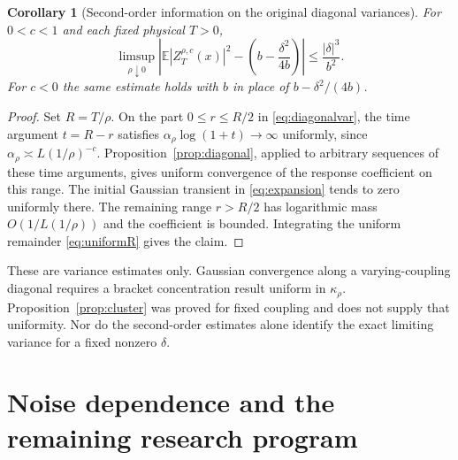 \documentclass[11pt]{article}
\numberwithin{equation}{section}
\newtheorem{corollary}[theorem]{Corollary}
\theoremstyle{definition}
\theoremstyle{remark}
\newcommand{\E}{\mathbb E}
\begin{document}
\begin{corollary}[Second-order information on the original diagonal variances]\label{cor:diagonal}
For $0<c<1$ and each fixed physical $T>0$,
\[
 \limsup_{\rho\downarrow0}\left|\E|Z_T^{\rho,c}(x)|^2-\left(b-\frac{\delta^2}{4b}\right)\right|\le\frac{|\delta|^3}{b^2}.
\]
For $c<0$ the same estimate holds with $b$ in place of $b-\delta^2/(4b)$.
\end{corollary}
\begin{proof}
Set $R=T/\rho$. On the part $0\le r\le R/2$ in \eqref{eq:diagonalvar}, the time argument $t=R-r$ satisfies $\alpha_\rho\log(1+t)\to\infty$ uniformly, since $\alpha_\rho\asymp L(1/\rho)^{-c}$. Proposition~\ref{prop:diagonal}, applied to arbitrary sequences of these time arguments, gives uniform convergence of the response coefficient on this range. The initial Gaussian transient in \eqref{eq:expansion} tends to zero uniformly there. The remaining range $r>R/2$ has logarithmic mass $O(1/L(1/\rho))$ and the coefficient is bounded. Integrating the uniform remainder \eqref{eq:uniformR} gives the claim.
\end{proof}
These are variance estimates only. Gaussian convergence along a varying-coupling diagonal requires a bracket concentration result uniform in $\kappa_\rho$. Proposition~\ref{prop:cluster} was proved for fixed coupling and does not supply that uniformity. Nor do the second-order estimates alone identify the exact limiting variance for a fixed nonzero $\delta$.

\section{Noise dependence and the remaining research program}
\end{document}
